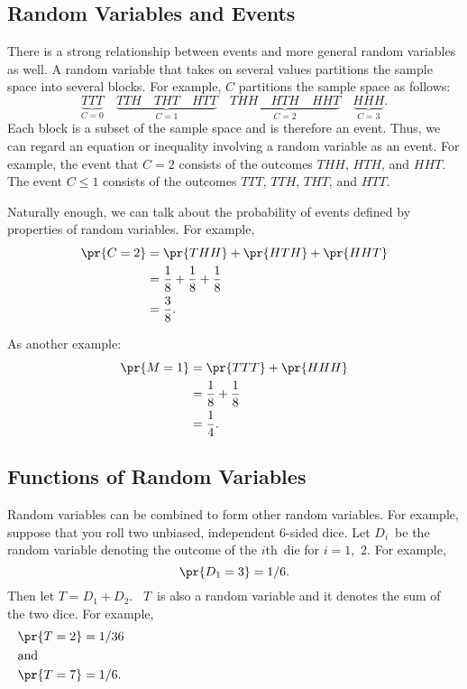 \subsection{Random Variables and Events}

There is a strong relationship between events and more general random
variables as well.  A random variable that takes on several values
partitions the sample space into several blocks.  For example, $C$
partitions the sample space as follows:
\[
\underbrace{TTT}_{\text{$C = 0$}} \quad
\underbrace{TTH \quad THT \quad HTT}_{\text{$C = 1$}} \quad
\underbrace{THH \quad HTH \quad HHT}_{\text{$C = 2$}} \quad
\underbrace{HHH}_{\text{$C = 3$}}.
\]
Each block is a subset of the sample space and is therefore
an event.  Thus, we can regard an equation or inequality involving a
random variable as an event.  For example, the event that $C = 2$
consists of the outcomes $THH$, $HTH$, and $HHT$.  The event $C \leq
1$ consists of the outcomes $TTT$, $TTH$, $THT$, and $HTT$.

Naturally enough, we can talk about the probability of events defined
by properties of random variables.  For example,
\begingroup
{}
\begin{align*}
\pr{C = 2}
        &=    \pr{THH} + \pr{HTH} + \pr{HHT} \\
        &=    \frac{1}{8} + \frac{1}{8} + \frac{1}{8} \\
        &=  \frac{3}{8}.
\end{align*}
\endgroup

As another example:
\begingroup{}
\begin{align*}
\pr{M = 1}
        &= \pr{TTT} + \pr{HHH}\\
        &= \frac{1}{8} + \frac{1}{8} \\
        &= \frac{1}{4}.
\end{align*}
\endgroup

\subsection{Functions of Random Variables}

Random variables can be combined to form other random variables.  For
example, suppose that you roll two unbiased, independent 6-sided
dice.  Let $D_i$~be the random variable denoting the outcome of the
$i$th~die for $i = 1$,~$2$.  For example,
\begin{equation*}
    \pr{D_1 = 3} = 1/6.
\end{equation*}
Then let $T = D_1 + D_2$. \ $T$~is also a random variable and it
denotes the sum of the two dice.  For example,
\begin{align*}
    \pr{T = 2} &= 1/36 \\
\noalign{\noindent and}
    \pr{T = 7} &= 1/6.
\end{align*}

